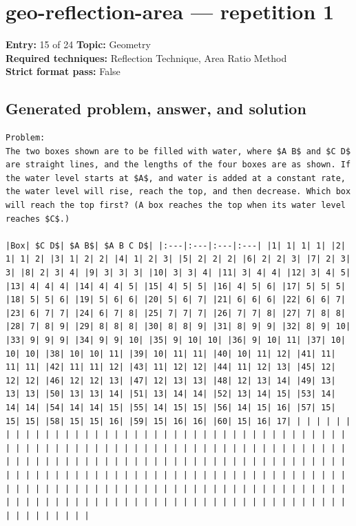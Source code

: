 \documentclass[11pt]{article}
\begin{document}
\section{geo-reflection-area --- repetition 1}
\begin{minipage}{\textwidth}
\color{metadata}\small\raggedright
\textbf{Entry:} 15 of 24\quad
\textbf{Topic:} Geometry\\[2pt]
\textbf{Required techniques:} Reflection Technique, Area Ratio Method\\[2pt]
\textbf{Strict format pass:} False
\end{minipage}

\subsection*{Generated problem, answer, and solution}
\begin{lstlisting}[style=modeloutput]
Problem:
The two boxes shown are to be filled with water, where $A B$ and $C D$ are straight lines, and the lengths of the four boxes are as shown. If the water level starts at $A$, and water is added at a constant rate, the water level will rise, reach the top, and then decrease. Which box will reach the top first? (A box reaches the top when its water level reaches $C$.)

|Box| $C D$| $A B$| $A B C D$| |:---|:---|:---|:---| |1| 1| 1| 1| |2| 1| 1| 2| |3| 1| 2| 2| |4| 1| 2| 3| |5| 2| 2| 2| |6| 2| 2| 3| |7| 2| 3| 3| |8| 2| 3| 4| |9| 3| 3| 3| |10| 3| 3| 4| |11| 3| 4| 4| |12| 3| 4| 5| |13| 4| 4| 4| |14| 4| 4| 5| |15| 4| 5| 5| |16| 4| 5| 6| |17| 5| 5| 5| |18| 5| 5| 6| |19| 5| 6| 6| |20| 5| 6| 7| |21| 6| 6| 6| |22| 6| 6| 7| |23| 6| 7| 7| |24| 6| 7| 8| |25| 7| 7| 7| |26| 7| 7| 8| |27| 7| 8| 8| |28| 7| 8| 9| |29| 8| 8| 8| |30| 8| 8| 9| |31| 8| 9| 9| |32| 8| 9| 10| |33| 9| 9| 9| |34| 9| 9| 10| |35| 9| 10| 10| |36| 9| 10| 11| |37| 10| 10| 10| |38| 10| 10| 11| |39| 10| 11| 11| |40| 10| 11| 12| |41| 11| 11| 11| |42| 11| 11| 12| |43| 11| 12| 12| |44| 11| 12| 13| |45| 12| 12| 12| |46| 12| 12| 13| |47| 12| 13| 13| |48| 12| 13| 14| |49| 13| 13| 13| |50| 13| 13| 14| |51| 13| 14| 14| |52| 13| 14| 15| |53| 14| 14| 14| |54| 14| 14| 15| |55| 14| 15| 15| |56| 14| 15| 16| |57| 15| 15| 15| |58| 15| 15| 16| |59| 15| 16| 16| |60| 15| 16| 17| | | | | | | | | | | | | | | | | | | | | | | | | | | | | | | | | | | | | | | | | | | | | | | | | | | | | | | | | | | | | | | | | | | | | | | | | | | | | | | | | | | | | | | | | | | | | | | | | | | | | | | | | | | | | | | | | | | | | | | | | | | | | | | | | | | | | | | | | | | | | | | | | | | | | | | | | | | | | | | | | | | | | | | | | | | | | | | | | | | | | | | | | | | | | | | | | | | | | | | | | | | | | | | | | | | | | | | | | | | | | | | | | |
\end{lstlisting}
\clearpage
\end{document}

